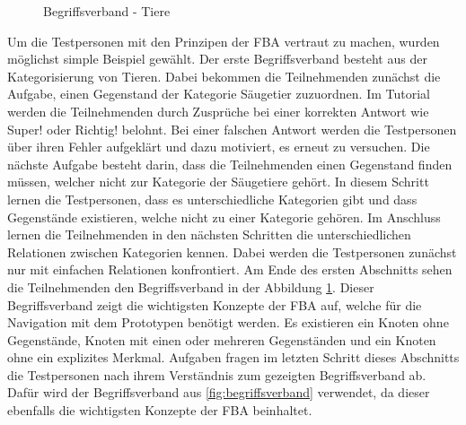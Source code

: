 \begin{figure}[!ht]
    \centering
    \caption{\label{fig:begriffsverband-tiere}Begriffsverband - Tiere}
\end{figure}

Um die Testpersonen mit den Prinzipen der \ac{FBA} vertraut zu machen, wurden möglichst simple Beispiel gewählt.
Der erste Begriffsverband besteht aus der Kategorisierung von Tieren.
Dabei bekommen die Teilnehmenden zunächst die Aufgabe, einen Gegenstand der Kategorie Säugetier zuzuordnen.
Im Tutorial werden die Teilnehmenden durch Zusprüche bei einer korrekten Antwort wie \glqq Super!\grqq{} oder \glqq Richtig!\grqq{} belohnt.
Bei einer falschen Antwort werden die Testpersonen über ihren Fehler aufgeklärt und dazu motiviert, es erneut zu versuchen.
Die nächste Aufgabe besteht darin, dass die Teilnehmenden einen Gegenstand finden müssen, welcher nicht zur Kategorie der Säugetiere gehört.
In diesem Schritt lernen die Testpersonen, dass es unterschiedliche Kategorien gibt und dass Gegenstände existieren, welche nicht zu einer Kategorie gehören.
Im Anschluss lernen die Teilnehmenden in den nächsten Schritten die unterschiedlichen Relationen zwischen Kategorien kennen.
Dabei werden die Testpersonen zunächst nur mit einfachen Relationen konfrontiert.
Am Ende des ersten Abschnitts sehen die Teilnehmenden den Begriffsverband in der Abbildung \ref{fig:begriffsverband-tiere}.
Dieser Begriffsverband zeigt die wichtigsten Konzepte der \ac{FBA} auf, welche für die Navigation mit dem Prototypen benötigt werden.
Es existieren ein Knoten ohne Gegenstände, Knoten mit einen oder mehreren Gegenständen und ein Knoten ohne ein explizites Merkmal.
Aufgaben fragen im letzten Schritt dieses Abschnitts die Testpersonen nach ihrem Verständnis zum gezeigten Begriffsverband ab.
Dafür wird der Begriffsverband aus \autoref{fig:begriffsverband} verwendet, da dieser ebenfalls die wichtigsten Konzepte der \ac{FBA} beinhaltet.\\

